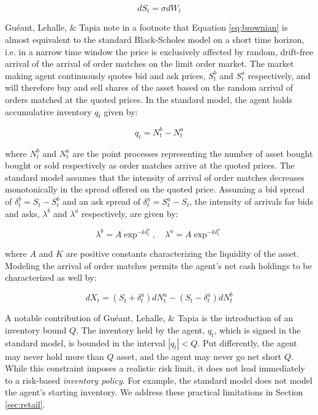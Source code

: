 \documentclass{article}
\begin{document}
\begin{equation}
\label{eq:brownian}
dS_{t} = \sigma dW_{t}
\end{equation}

Guéant, Lehalle, \& Tapia note in a footnote that Equation \ref{eq:brownian} is almost equivalent to the standard Black-Scholes model on a short time horizon, i.e. in a narrow time window the price is exclusively affected by random, drift-free arrival of the arrival of order matches on the limit order market. The market making agent continuously quotes bid and ask prices, $S^b_t$ and $S^a_t$ respectively, and will therefore buy and sell shares of the asset based on the random arrival of orders matched at the quoted prices. In the standard model, the agent holds accumulative inventory $q_t$ given by:

\begin{equation}
\label{eq:inventory}
q_{t} = N^b_{t} - N^a_{t}
\end{equation}

where $N^b_{t}$ and $N^a_{t}$ are the point processes representing the number of asset bought bought or sold respectively as order matches arrive at the quoted prices. The standard model assumes that the intensity of arrival of order matches decreases monotonically in the spread offered on the quoted price. Assuming a bid spread of $\delta^b_t = S_t - S^b_t$ and an ask spread of $\delta^a_t = S^a_t - S_t$, the intensity of arrivals for bids and asks, $\lambda^b$ and $\lambda^a$ respectively, are given by:

\begin{equation}
\label{eq:arrival}
\lambda^b = A \exp^{-k \delta^b_t}, \quad
\lambda^a = A \exp^{-k \delta^a_t}
\end{equation}

where $A$ and $K$ are positive constants characterizing the liquidity of the asset. Modeling the arrival of order matches permits the agent's net cash holdings to be characterized as well by:

\begin{equation}
\label{eq:cash}
dX_t = ( S_t + \delta^a_t ) dN^a_t - ( S_t - \delta^a_t ) dN^b_t
\end{equation}

A notable contribution of Guéant, Lehalle, \& Tapia is the introduction of an inventory bound $Q$. The inventory held by the agent, $q_t$, which is signed in the standard model, is bounded in the interval $|q_t| < Q$. Put differently, the agent may never hold more than $Q$ asset, and the agent may never go net short $Q$. While this constraint imposes a realistic risk limit, it does not lead immediately to a risk-based \emph{inventory policy}. For example, the standard model does not model the agent's starting inventory. We address these practical limitations in Section \ref{sec:retail}.
\end{document}
